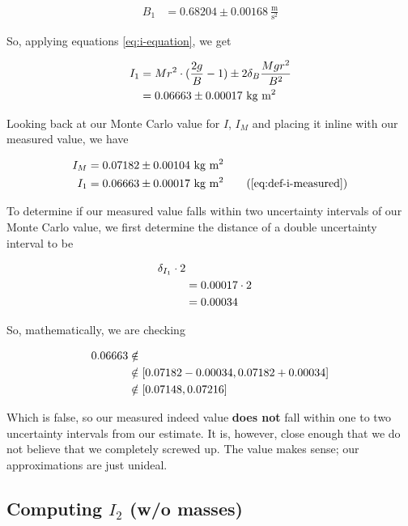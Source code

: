 \documentclass[coverpage]{article}
\newcommand{\iUnit}{\text{kg $\text{m}^2$}}
\newcommand{\mpssq}{\frac{\text{m}}{\text{s}^2}}
\begin{document}
	\begin{align}
		B_1 &= 0.68204 \pm 0.00168\ \mpssq \label{eq:def-b1}
	\end{align}

	So, applying equations \ref{eq:i-equation}, we get
	
	\begin{align}
		I_1 &= Mr^2 \cdot (\frac{2g}{B} - 1) \pm 2 \delta_B \frac{M g r^2}{B^2} \notag \\
		&= 0.06663 \pm 0.00017\ \iUnit \label{eq:def-i-measured}
	\end{align}

	Looking back at our Monte Carlo value for $I$, $I_M$ and placing it inline with our measured value, we have
		
	\begin{align}
		I_M &= 0.07182 \pm 0.00104\ \iUnit \notag \\
		I_1 &= 0.06663 \pm 0.00017\ \iUnit \tag{\ref{eq:def-i-measured}}
	\end{align}

	To determine if our measured value falls within two uncertainty intervals of our Monte Carlo value, we first determine the distance of a double uncertainty interval to be
	 
	\begin{align}
		\delta_{I_1} \cdot 2 \notag \\
		&= 0.00017 \cdot 2 \notag \\
		&= 0.00034 \notag
	\end{align}
	
	So, mathematically, we are checking
	
	\begin{align}
		0.06663 &\notin \notag \\
		&\notin [0.07182 - 0.00034, 0.07182 + 0.00034] \notag \\
		&\notin [0.07148, 0.07216]
	\end{align}

	\newcommand{\iSkew}{\Delta{I}_{\text{skew}}}

	Which is false, so our measured indeed value \textbf{does not} fall within one to two uncertainty intervals from our estimate. It is, however, close enough that we do not believe that we completely screwed up. The value makes sense; our approximations are just unideal.

	\subsection{Computing $I_2$ (w/o masses)}
	
\end{document}
